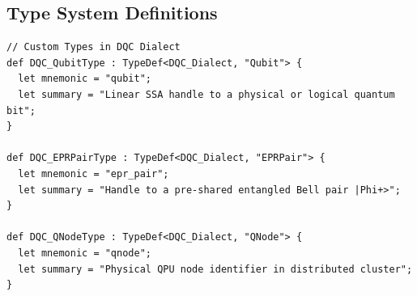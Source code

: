 \subsection{Type System Definitions}
\begin{lstlisting}[language=MLIR, caption={TableGen Type Definitions for DQC (DQCTypes.td)}]
// Custom Types in DQC Dialect
def DQC_QubitType : TypeDef<DQC_Dialect, "Qubit"> {
  let mnemonic = "qubit";
  let summary = "Linear SSA handle to a physical or logical quantum bit";
}

def DQC_EPRPairType : TypeDef<DQC_Dialect, "EPRPair"> {
  let mnemonic = "epr_pair";
  let summary = "Handle to a pre-shared entangled Bell pair |Phi+>";
}

def DQC_QNodeType : TypeDef<DQC_Dialect, "QNode"> {
  let mnemonic = "qnode";
  let summary = "Physical QPU node identifier in distributed cluster";
}
\end{lstlisting}

